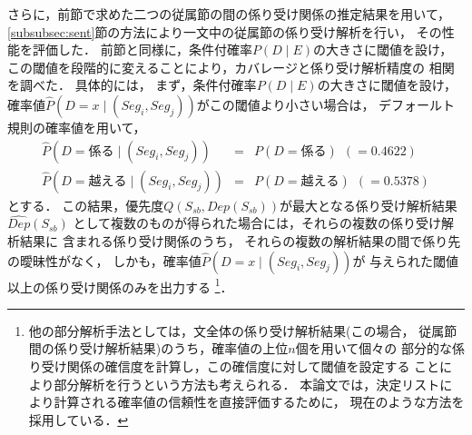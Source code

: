 \label{subsubsec:subsent}
さらに，前節で求めた二つの従属節の間の係り受け関係の推定結果を用いて，
\ref{subsubsec:sent}節の方法により一文中の従属節の係り受け解析を行い，
その性能を評価した．
前節と同様に，条件付確率$P(D\mid E)$の大きさに閾値を設け，
この閾値を段階的に変えることにより，カバレージと係り受け解析精度の
相関を調べた．
具体的には，
まず，条件付確率$P(D\mid E)$の大きさに閾値を設け，
確率値$\hat{P}(D\!=\!x\mid (Seg_i,Seg_j))$がこの閾値より小さい場合は，
デフォールト規則の確率値を用いて，
\vspace{-2mm}
\begin{eqnarray*}
\hat{P}(D\!=\!係る\mid (Seg_i,Seg_j)) & = & P(D\!=\!係る)\ \  ( =  0.4622) \\
\hat{P}(D\!=\!越える\mid (Seg_i,Seg_j)) & = &   P(D\!=\!越える)\ \  ( = 0.5378) 
\end{eqnarray*}
とする．
この結果，優先度$Q(S_{sb},Dep(S_{sb}))$が最大となる係り受け解析結果$\hat{Dep}(S_{sb})$
として複数のものが得られた場合には，それらの複数の係り受け解析結果に
含まれる係り受け関係のうち，
それらの複数の解析結果の間で係り先の曖昧性がなく，
しかも，確率値$\hat{P}(D\!=\!x\mid (Seg_i,Seg_j))$が
与えられた閾値以上の係り受け関係のみを出力する
\footnote{
  他の部分解析手法としては，文全体の係り受け解析結果(この場合，
  従属節間の係り受け解析結果)のうち，確率値の上位$n$個を用いて個々の
  部分的な係り受け関係の確信度を計算し，この確信度に対して閾値を設定する
  ことにより部分解析を行うという方法\cite{Inui98aj,Fujio99aj}も考えられる．
  本論文では，決定リストにより計算される確率値の信頼性を直接評価するために，
  現在のような方法を採用している．
}．



